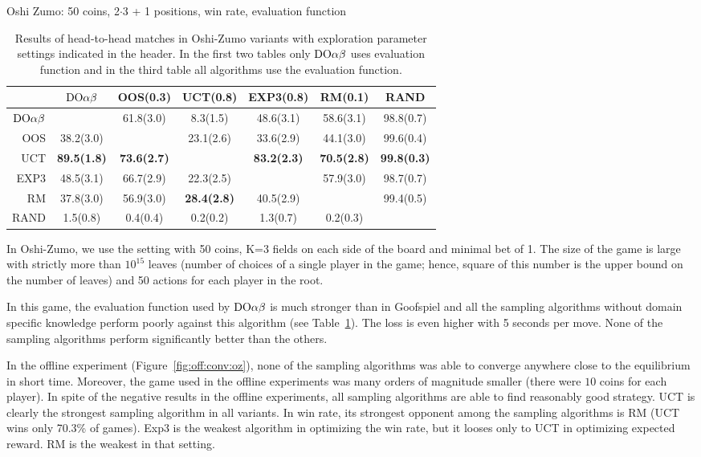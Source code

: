 \begin{table}[t!]
\begin{scriptsize}
Oshi Zumo: 50 coins, 2$\cdot$3 + 1 positions, win rate, evaluation function
\begin{tabular}{|r|cccccc|}\hline
&$\textrm{DO}\alpha\beta$&OOS(0.3)&UCT(0.8)&EXP3(0.8)&RM(0.1)&RAND\\\hline
$\textrm{DO}\alpha\beta$&&61.8(3.0)&8.3(1.5)&48.6(3.1)&58.6(3.1)&98.8(0.7)\\
OOS&38.2(3.0)&&23.1(2.6)&33.6(2.9)&44.1(3.0)&99.6(0.4)\\
UCT&\textbf{89.5(1.8)}&\textbf{73.6(2.7)}&&\textbf{83.2(2.3)}&\textbf{70.5(2.8)}&\textbf{99.8(0.3)}\\
EXP3&48.5(3.1)&66.7(2.9)&22.3(2.5)&&57.9(3.0)&98.7(0.7)\\
RM&37.8(3.0)&56.9(3.0)&\textbf{28.4(2.8)}&40.5(2.9)&&99.4(0.5)\\
RAND&1.5(0.8)&0.4(0.4)&0.2(0.2)&1.3(0.7)&0.2(0.3)&\\
\hline
\end{tabular}
\end{scriptsize}
\caption{Results of head-to-head matches in Oshi-Zumo variants with exploration parameter settings indicated in the header. In the first two tables only $\textrm{DO}\alpha\beta$ uses evaluation function and in the third table all algorithms use the evaluation function.}\label{fig:matches:oz}
\end{table}

In Oshi-Zumo, we use the setting with 50 coins, K=3 fields on each side of the board and minimal bet of 1. 
The size of the game is large with strictly more than $10^{15}$ leaves (number of choices of a single player in the game; hence, square of this number is the upper bound on the number of leaves) and 50 actions for each player in the root.

In this game, the evaluation function used by $\textrm{DO}\alpha\beta$ is much stronger than in Goofspiel and all the sampling algorithms without domain specific knowledge perform poorly against this algorithm (see Table~\ref{fig:matches:oz}). The loss is even higher with 5 seconds per move. None of the sampling algorithms perform significantly better than the others.

In the offline experiment (Figure~\ref{fig:off:conv:oz}), none of the sampling algorithms was able to converge anywhere close to the equilibrium in short time. Moreover, the game used in the offline experiments was many orders of magnitude smaller (there were $10$ coins for each player). 
In spite of the negative results in the offline experiments, all sampling algorithms are able to find reasonably good strategy.
UCT is clearly the strongest sampling algorithm in all variants. 
In win rate, its strongest opponent among the sampling algorithms is RM (UCT wins only 70.3\% of games). Exp3 is the weakest algorithm in optimizing the win rate, but it looses only to UCT in optimizing expected reward. RM is the weakest in that setting.

